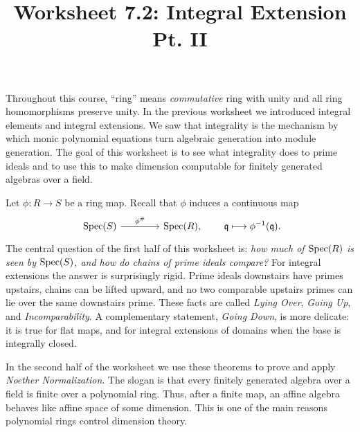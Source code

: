 \documentclass[12pt,reqno]{amsart}
\title{Worksheet 7.2: Integral Extension Pt. II}
\begin{document}

\maketitle
\thispagestyle{firstpage2}
Throughout this course, ``ring'' means \textit{commutative} ring with unity and all ring homomorphisms preserve unity. In the previous worksheet we introduced integral elements and integral extensions. We saw that integrality is the mechanism by which monic polynomial equations turn algebraic generation into module generation. The goal of this worksheet is to see what integrality does to prime ideals and to use this to make dimension computable for finitely generated algebras over a field.

Let $\phi:R\to S$ be a ring map. Recall that $\phi$ induces a continuous map
\[
\begin{tikzcd}[row sep=.3em, column sep=4em]
\Spec(S) \arrow[r, "\phi^{\#}"] & \Spec(R),
\end{tikzcd}
\qquad
\fq\longmapsto \phi^{-1}(\fq).
\]
The central question of the first half of this worksheet is: \emph{how much of $\operatorname{Spec}(R)$ is seen by $\operatorname{Spec}(S)$, and how do chains of prime ideals compare?} For integral extensions the answer is surprisingly rigid. Prime ideals downstairs have primes upstairs, chains can be lifted upward, and no two comparable upstairs primes can lie over the same downstairs prime. These facts are called \emph{Lying Over}, \emph{Going Up}, and \emph{Incomparability}. A complementary statement, \emph{Going Down}, is more delicate: it is true for flat maps, and for integral extensions of domains when the base is integrally closed.

In the second half of the worksheet we use these theorems to prove and apply \emph{Noether Normalization}. The slogan is that every finitely generated algebra over a field is finite over a polynomial ring. Thus, after a finite map, an affine algebra behaves like affine space of some dimension. This is one of the main reasons polynomial rings control dimension theory.

\hrulefill
\end{document}
